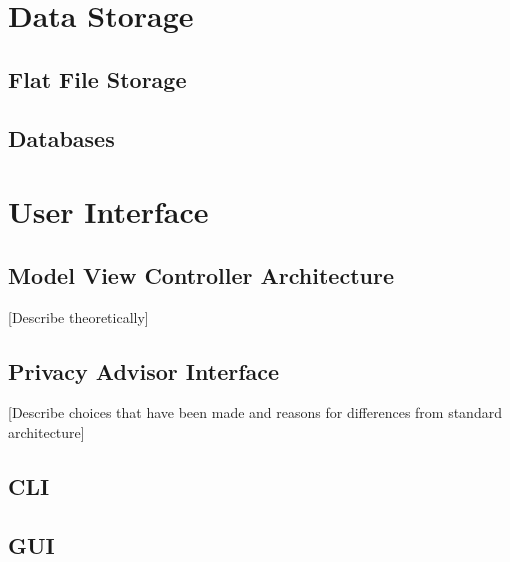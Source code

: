 \section{Data Storage}

\subsection{Flat File Storage}

\subsection{Databases}

\section{User Interface}

\subsection{Model View Controller Architecture}
[Describe theoretically]

\subsection{Privacy Advisor Interface}
[Describe choices that have been made and reasons for differences from standard architecture]

\subsection{CLI}

\subsection{GUI}